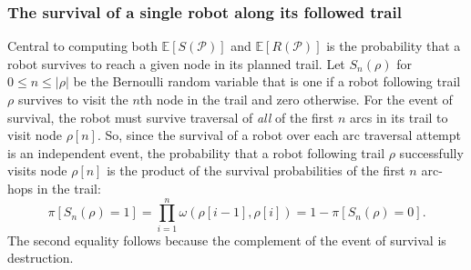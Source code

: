 \documentclass[fleqn,10pt,lineno]{wlpeerj}
\begin{document}
\subsubsection{The survival of a single robot along its followed trail}
Central to computing both $\mathbb{E}[S(\mathcal{P})]$ and $\mathbb{E}[R(\mathcal{P})]$ is the probability that a robot survives to reach a given node in its planned trail.
Let $S_n(\rho)$ for $0 \leq n \leq \lvert \rho \rvert$ be the Bernoulli random variable that is one if a robot following trail $\rho$ survives to visit the $n$th node in the trail and zero otherwise. 
For the event of survival, the robot must survive traversal of \emph{all} of the first $n$ arcs in its trail to visit node $\rho[n]$. So, since the survival of a robot over each arc traversal attempt is an independent event, the probability that a robot following trail $\rho$ successfully visits node $\rho[n]$ is the product of the survival probabilities of the first $n$ arc-hops in the trail:
\begin{equation}
	\pi[S_n(\rho) = 1] = \prod_{i=1}^n \omega(\rho[i-1], \rho[i]) 
	= 1 - \pi[S_n(\rho) = 0]. \label{eq:pi_S_n}
\end{equation} %
The second equality follows because the complement of the event of survival is destruction.
\end{document}
